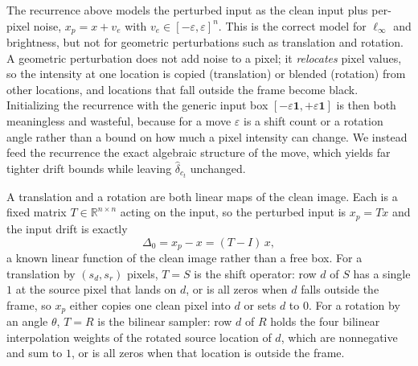 \documentclass[11pt]{article}
\newcommand{\RR}{\mathbb{R}}
\newcommand{\ep}{\varepsilon}
\begin{document}
The recurrence above models the perturbed input as the clean input plus per-pixel noise, $x_p = x + v_e$ with $v_e \in [-\ep,\ep]^n$. This is the correct model for $\ell_\infty$ and brightness, but not for geometric perturbations such as translation and rotation. A geometric perturbation does not add noise to a pixel; it \emph{relocates} pixel values, so the intensity at one location is copied (translation) or blended (rotation) from other locations, and locations that fall outside the frame become black. Initializing the recurrence with the generic input box $[-\ep\mathbf{1}, +\ep\mathbf{1}]$ is then both meaningless and wasteful, because for a move $\ep$ is a shift count or a rotation angle rather than a bound on how much a pixel intensity can change. We instead feed the recurrence the exact algebraic structure of the move, which yields far tighter drift bounds while leaving $\hat{\delta}_{c_t}$ unchanged.

A translation and a rotation are both linear maps of the clean image. Each is a fixed matrix $T \in \RR^{n \times n}$ acting on the input, so the perturbed input is $x_p = T x$ and the input drift is exactly
\begin{equation}
  \Delta_0 = x_p - x = (T - I)\, x,
  \label{eq:geom_drift}
\end{equation}
a known linear function of the clean image rather than a free box. For a translation by $(s_d, s_r)$ pixels, $T = S$ is the shift operator: row $d$ of $S$ has a single $1$ at the source pixel that lands on $d$, or is all zeros when $d$ falls outside the frame, so $x_p$ either copies one clean pixel into $d$ or sets $d$ to $0$. For a rotation by an angle $\theta$, $T = R$ is the bilinear sampler: row $d$ of $R$ holds the four bilinear interpolation weights of the rotated source location of $d$, which are nonnegative and sum to $1$, or is all zeros when that location is outside the frame.
\end{document}
